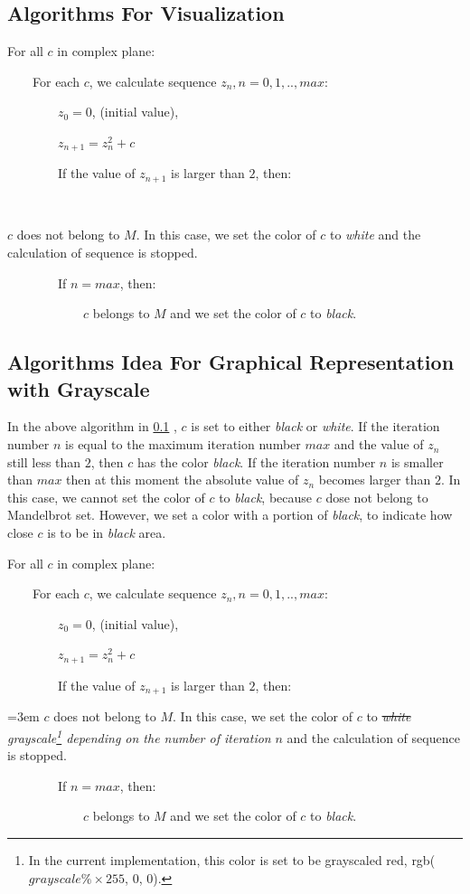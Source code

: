 \subsection{Algorithms For Visualization}\label{chap2:algorithmsforvisualization}

For all $c$ in complex plane:

~~~~For each $c$, we calculate sequence $z_n, n = 0, 1, .., max$:

~~~~~~~~$z_0 = 0$, (initial value),

~~~~~~~~$z_{n+1} = z_n^2 + c$

~~~~~~~~If the value of $z_{n+1}$ is larger than $2$, then:

~~~~~~~~~~~~\begin{minipage}[t]{0.9\textwidth} $c$ does not belong to $M$. In this case, we set the color of $c$ to \emph{white} and the calculation of sequence is stopped. \end{minipage}

~~~~~~~~If $n = max$, then:

~~~~~~~~~~~~$c$ belongs to $M$ and we set the color of $c$ to \emph{black}.

\subsection{Algorithms Idea For Graphical Representation with Grayscale}

In the above algorithm in \ref{chap2:algorithmsforvisualization} , $c$ is set to either \emph{black} or \emph{white}. If the iteration number $n$ is equal to the maximum iteration number $max$ and the value of $z_n$ still less than $2$, then $c$ has the color \emph{black}. If the iteration number $n$ is smaller than $max$ then at this moment the absolute value of $z_n$ becomes larger than $2$. In this case, we cannot set the color of $c$ to \emph{black}, because $c$ dose not belong to Mandelbrot set. However, we set a color with a portion of \emph{black}, to indicate how close $c$ is to be in \emph{black} area.

For all $c$ in complex plane:

~~~~For each $c$, we calculate sequence $z_n, n = 0, 1, .., max$:

~~~~~~~~$z_0 = 0$, (initial value),

~~~~~~~~$z_{n+1} = z_n^2 + c$

~~~~~~~~If the value of $z_{n+1}$ is larger than $2$, then:

\begingroup
    \leftskip=3em $c$ does not belong to $M$. In this case, we set the color of $c$ to \st{\emph{white}} \emph{grayscale\footnote{ In the current implementation, this color is set to be grayscaled red, rgb($grayscale\% \times 255$, 0, 0).} depending on the number of iteration} $n$ and the calculation of sequence is stopped.\par
\endgroup

~~~~~~~~If $n = max$, then:

~~~~~~~~~~~~$c$ belongs to $M$ and we set the color of $c$ to \emph{black}.